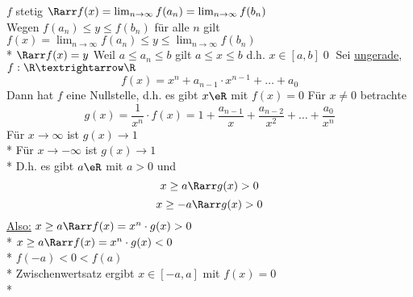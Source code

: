 	$f$ stetig $\Rarr f(x) = \lim_{n \to \infty} f(a_n) = \lim_{n \to \infty} f(b_n)$\\
	Wegen $f(a_n) \leq y \leq f(b_n)$ für alle $n$ gilt $f(x) = \lim_{n \to \infty} f(a_n) \leq y \leq \lim_{n \to \infty} f(b_n)$\\*
	$\Rarr f(x) = y$ 
%
\bem
Weil $a\leq a_n\leq b$ gilt $a\leq x\leq b$ d.h. $x\in[a,b]$\qed
{}
Sei \nN{} \ul{ungerade}, $f:\R→\R$
$$f(x)=x^n+a_{n-1}·x^{n-1}+…+a_0$$
Dann hat $f$ eine Nullstelle, d.h. es gibt $x\eR$ mit $f(x)=0$
\bew
Für $x\neq 0$ betrachte
$$g(x)=\frac{1}{x^n} \cdot f(x)=1+\frac{a_{n-1}}{x}+\frac{a_{n-2}}{x^2}+…+\frac{a_0}{x^n}$$
Für $x→∞$ ist $g(x)→1$\\*
Für $x→-∞$ ist $g(x)→1$\\*
D.h. es gibt $a\eR$ mit $a>0$ und
$$x\geq a \Rarr g(x)>0$$
$$x\geq -a \Rarr g(x)>0$$
%
\ul{Also:} $x \geq a \Rarr f(x) = x^n \cdot g(x) > 0$\\*
	$x \geq a \Rarr f(x) = x^n \cdot g(x) < 0$\\* %
	$f(-a) < 0 < f(a)$\\*
	Zwischenwertsatz \Rarr ergibt $x \in [-a, a]$ mit $f(x) = 0$\\*

